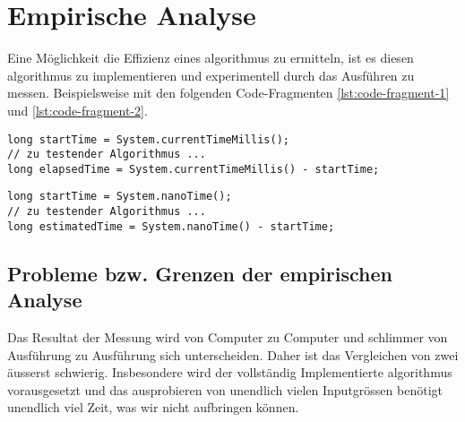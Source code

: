 \section{Empirische Analyse}

Eine Möglichkeit die Effizienz eines \gls{algorithmus} zu ermitteln, ist es diesen \gls{algorithmus} zu implementieren und experimentell durch das Ausführen zu messen. Beispielsweise mit den folgenden Code-Fragmenten \ref{lst:code-fragment-1} und \ref{lst:code-fragment-2}.

\par \medskip

\renewcommand{\lstlistingname}{Code Fragment}%

\begin{lstlisting}[captionpos=b,caption={Typische Lösung für die Zeitmessung eines Algorithmus in Java},label={lst:code-fragment-1}]
long startTime = System.currentTimeMillis();
// zu testender Algorithmus ...
long elapsedTime = System.currentTimeMillis() - startTime;   
\end{lstlisting}

\par \medskip

\begin{lstlisting}[captionpos=b,caption={Zeitmessung eines Algorithmus in Java mit nanoTime()},label={lst:code-fragment-2}]
long startTime = System.nanoTime();
// zu testender Algorithmus ...
long estimatedTime = System.nanoTime() - startTime;
\end{lstlisting}

\subsection*{Probleme bzw. Grenzen der empirischen Analyse}
Das Resultat der Messung wird von Computer zu Computer und schlimmer von Ausführung zu Ausführung sich unterscheiden. Daher ist das Vergleichen von zwei  äusserst schwierig. Insbesondere wird der vollständig Implementierte \gls{algorithmus} vorausgesetzt und das ausprobieren von unendlich vielen Inputgrössen benötigt unendlich viel Zeit, was wir nicht aufbringen können.